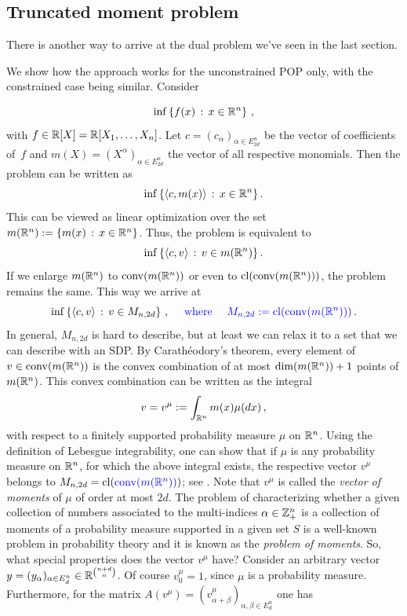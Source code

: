 \subsection{Truncated moment problem}

There is another way to arrive at the dual problem we've seen in the last section. 

We show how the approach works for the unconstrained POP only, with the constrained case being similar.
Consider

\begin{equation}
	\label{our:inf:problem}
	\inf \left\{ f(x)  \,:\, x \in \mathbb{R}^n \right\}\,,
\end{equation}
with $f \in \mathbb{R}[X]=\mathbb{R}[X_1,\ldots,X_n]$. Let $c = (c_\alpha)_{\alpha \in E_{2d}^n}$ be the vector of coefficients of~$f$ and $m(X) = (X^\alpha)_{\alpha \in E_{2d}^n}$ the vector of all respective monomials. Then the problem can be written as 
\begin{equation}
	\inf \left\{  \left\langle c , m(x) \right\rangle  \,:\, x \in \mathbb{R}^n \right\}.
\end{equation}
This can be viewed as linear optimization over the set $m(\mathbb{R}^n):=\left\{ m(x) \,:\, x \in \mathbb{R}^n \right\}$. Thus, the problem is equivalent to
\begin{equation}
	\inf \left\{ \left\langle c , v \right\rangle \,:\, v \in m(\mathbb{R}^n) \right\}.
\end{equation}
If we enlarge $m(\mathbb{R}^n)$ to $\operatorname{conv}(m(\mathbb{R}^n))$ or even to $\operatorname{cl}(\operatorname{conv}(m(\mathbb{R}^n)))$, the problem remains the same. This way we arrive at 
\begin{equation}
	\label{lin:probl:on:M}
	\inf \left\{ \left\langle c , v \right\rangle \,:\,  v \in M_{n,2d} \right\}\,, \quad \textcolor{blue}{\textrm{ where } \quad M_{n,2d} := \operatorname{cl}(\operatorname{conv}(m(\mathbb{R}^n)))} \,.
\end{equation}
In general, $M_{n,2d}$ is hard to describe, but at least we can relax it to a set that we can describe with an SDP. By Carath\'{e}odory's theorem, every element of $v \in \operatorname{conv}(m(\mathbb{R}^n))$ is the convex combination of at most $\dim(m(\mathbb{R}^n))+1$ points of $m(\mathbb{R}^n)$. This convex combination can be written as the integral
\[
	v = v^\mu:= \int_{\mathbb{R}^n} m(x) \mu( d x) \,,
\]
with respect to a finitely supported probability measure $\mu$ on $\mathbb{R}^n$. Using the definition of Lebesgue integrability, one can show that if $\mu$ is any probability measure on $\mathbb{R}^n$, for which the above integral exists, the respective vector $v^\mu$ belongs to $M_{n,2d}=\operatorname{cl}(\textcolor{blue}{\operatorname{conv}(m(\mathbb{R}^n))})$; see \cite[Definitions~11.21, 11.22]{Rudin}. Note that $v^\mu$ is called the \emph{vector of moments} of $\mu$ of order at most $2d$. The problem of characterizing whether a given collection of numbers associated to the multi-indices $\alpha \in \mathbb{Z}_+^n$ is a collection of moments of a probability measure supported in a given set $S$ is a well-known problem in probability theory and it is known as the \emph{problem of moments}. So, what special properties does the vector $v^\mu$ have? Consider an arbitrary vector $y=(y_\alpha)_{\alpha \in E_d^n} \in \mathbb{R}^{\binom{n+d}{n}}$. Of course $v^\mu_0=1$, since $\mu$ is a probability measure. Furthermore, for the matrix $A(v^\mu) = (v^\mu_{\alpha+\beta})_{\alpha,\beta \in E_d^n}$ one has
